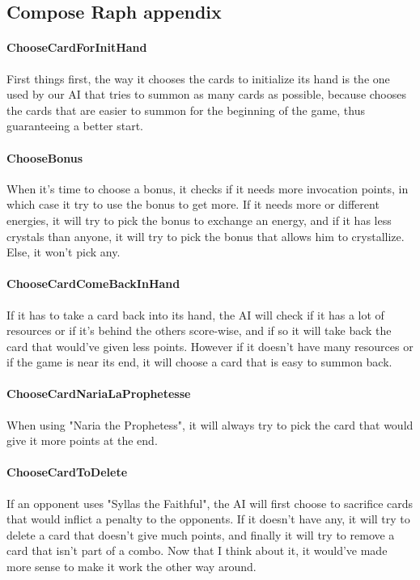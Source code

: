 

\appendix

\begin{appendices}

\section{Compose Raph appendix}\label{compose_raph_appendix}

\paragraph{ChooseCardForInitHand}
First things first, the way it chooses the cards to initialize its hand is the one used by our AI that tries to summon as many cards as possible, because chooses the cards that are easier to summon for the beginning of the game, thus guaranteeing a better start.

\paragraph{ChooseBonus}
When it's time to choose a bonus, it checks if it needs more invocation points, in which case it try to use the bonus to get more. If it needs more or different energies, it will try to pick the bonus to exchange an energy, and if it has less crystals than anyone, it will try to pick the bonus that allows him to crystallize. Else, it won't pick any.

\paragraph{ChooseCardComeBackInHand}
If it has to take a card back into its hand, the AI will check if it has a lot of resources or if it's behind the others score-wise, and if so it will take back the card that would've given less points. However if it doesn't have many resources or if the game is near its end, it will choose a card that is easy to summon back.

\paragraph{ChooseCardNariaLaProphetesse}
When using "Naria the Prophetess", it will always try to pick the card that would give it more points at the end.

\paragraph{ChooseCardToDelete}
If an opponent uses "Syllas the Faithful", the AI will first choose to sacrifice cards that would inflict a penalty to the opponents. If it doesn't have any, it will try to delete a card that doesn't give much points, and finally it will try to remove a card that isn't part of a combo. Now that I think about it, it would've made more sense to make it work the other way around.


\end{appendices}
